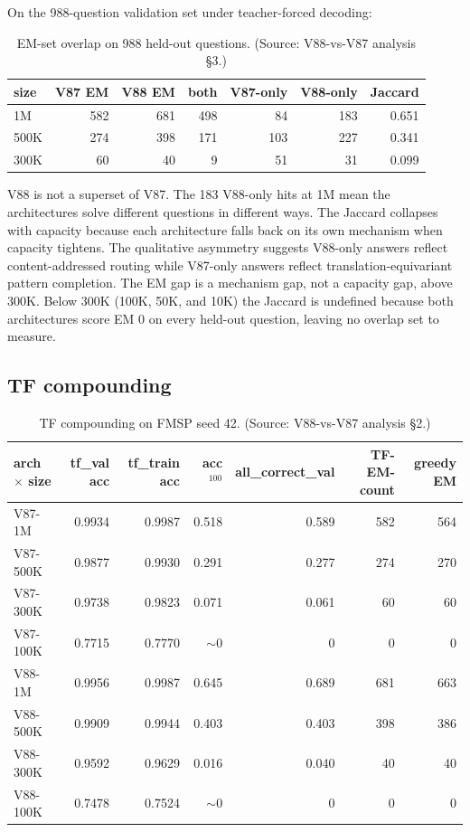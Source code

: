 \documentclass[11pt]{article}
\begin{document}
On the 988-question validation set under teacher-forced decoding:

\begin{table}[!t]
\small
\caption{EM-set overlap on 988 held-out questions. (Source: V88-vs-V87 analysis \S3.)}
\label{tab:em-overlap}
\centering
\begin{tabular}{lrrrrrr}
\toprule
size & V87 EM & V88 EM & both & V87-only & V88-only & Jaccard \\
\midrule
1M   & 582 & 681 & 498 & 84  & 183 & 0.651 \\
500K & 274 & 398 & 171 & 103 & 227 & 0.341 \\
300K &  60 &  40 &   9 &  51 &  31 & 0.099 \\
\bottomrule
\end{tabular}
\end{table}

V88 is not a superset of V87. The 183 V88-only hits at 1M mean the architectures solve different questions in different ways. The Jaccard collapses with capacity because each architecture falls back on its own mechanism when capacity tightens. The qualitative asymmetry suggests V88-only answers reflect content-addressed routing while V87-only answers reflect translation-equivariant pattern completion. The EM gap is a mechanism gap, not a capacity gap, above 300K. Below 300K (100K, 50K, and 10K) the Jaccard is undefined because both architectures score EM 0 on every held-out question, leaving no overlap set to measure.

\subsection{TF compounding}

\begin{table}[!t]
\small
\caption{TF compounding on FMSP seed 42. (Source: V88-vs-V87 analysis \S2.)}
\label{tab:tf-comp}
\centering
\begin{tabular}{lrrrrrr}
\toprule
arch $\times$ size & tf\_val acc & tf\_train acc & acc$^{100}$ & all\_correct\_val & TF-EM-count & greedy EM \\
\midrule
V87-1M  & 0.9934 & 0.9987 & 0.518 & 0.589 & 582 & 564 \\
V87-500K & 0.9877 & 0.9930 & 0.291 & 0.277 & 274 & 270 \\
V87-300K & 0.9738 & 0.9823 & 0.071 & 0.061 &  60 &  60 \\
V87-100K & 0.7715 & 0.7770 &   $\sim$0 &     0 &   0 &   0 \\
V88-1M  & 0.9956 & 0.9987 & 0.645 & 0.689 & 681 & 663 \\
V88-500K & 0.9909 & 0.9944 & 0.403 & 0.403 & 398 & 386 \\
V88-300K & 0.9592 & 0.9629 & 0.016 & 0.040 &  40 &  40 \\
V88-100K & 0.7478 & 0.7524 &   $\sim$0 &     0 &   0 &   0 \\
\bottomrule
\end{tabular}
\end{table}
\end{document}

